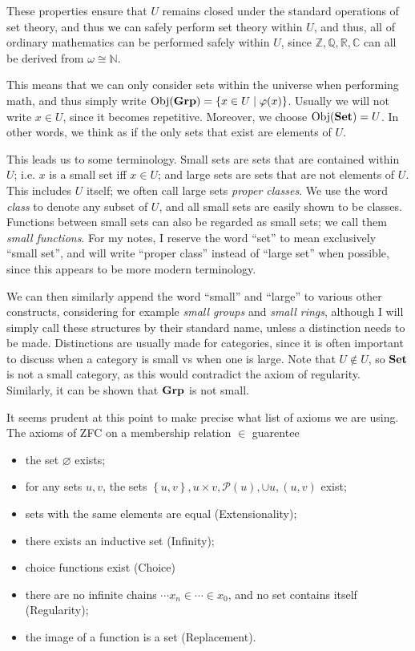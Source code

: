 These properties ensure that $U$ remains closed under the standard operations of set theory, and thus we can safely perform set theory within $U$, and thus, all of ordinary mathematics can be performed safely within $U$, since $\mathbb{Z} ,\mathbb{Q} ,\mathbb{R} ,\mathbb{C} $ can all be derived from $\omega \cong \mathbb{N} $.

This means that we can only consider sets within the universe when performing math, and thus simply write $\operatorname{Obj}(\mathbf{Grp} ) =\left\{ x\in U\mid \varphi (x) \right\} $. Usually we will not write $x\in U$, since it becomes repetitive. Moreover, we choose $\operatorname{Obj}(\mathbf{Set} )=U$. In other words, we think as if the only sets that exist are elements of $U$.

This leads us to some terminology. Small sets are sets that are contained within $U$; i.e. $x$ is a small set iff $x\in U$; and large sets are sets that are not elements of $U$. This includes $U$ itself; we often call large sets \emph{proper classes}. We use the word \emph{class} to denote any subset of $U$, and all small sets are easily shown to be classes. Functions between small sets can also be regarded as small sets; we call them \emph{small functions}. For my notes, I reserve the word ``set'' to mean exclusively ``small set'', and will write ``proper class'' instead of ``large set'' when possible, since this appears to be more modern terminology.

We can then similarly append the word ``small'' and ``large'' to various other constructs, considering for example \emph{small groups} and \emph{small rings}, although I will simply call these structures by their standard name, unless a distinction needs to be made. Distinctions are usually made for categories, since it is often important to discuss when a category is small vs when one is large. Note that $U\notin U$, so $\mathbf{Set} $ is not a small category, as this would contradict the axiom of regularity. Similarly, it can be shown that $\mathbf{Grp} $ is not small.

It seems prudent at this point to make precise what list of axioms we are using. The axioms of ZFC on a membership relation $\in$ guarentee
\begin{itemize}
	\item the set $\varnothing $ exists;
	\item for any sets $u,v$, the sets $\left\{ u,v \right\} ,u\times v,\mathscr{P} (u),\cup u,(u,v)$ exist;
	\item sets with the same elements are equal (Extensionality);
	\item there exists an inductive set (Infinity);
	\item choice functions exist (Choice)
	\item there are no infinite chains $\cdots x_n\in \cdots \in x_0$, and no set contains itself (Regularity);
	\item the image of a function is a set (Replacement).
\end{itemize}

